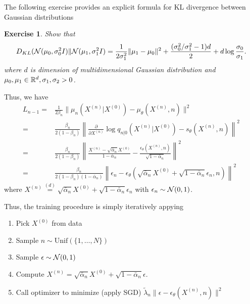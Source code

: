 \documentclass[11pt]{article}
\newtheorem{exercise}{Exercise}
\begin{document}
The following exercise provides an explicit formula for KL divergence between Gaussian distributions
\begin{exercise}
    Show that
    \begin{align}
        D_{KL}({\cal N}(\mu_0, \sigma_0^2I) \|{\cal N}(\mu_1, \sigma_1^2I) 
        = \frac{1}{2\sigma_1^2} \|\mu_1-\mu_0\|^2 + \frac{(\sigma_0^2/\sigma_1^2 -1)d}{2} + d\log \frac{\sigma_0}{\sigma_1}.
    \end{align}
    where $d$ is dimension of multidimensional Gaussian distribution and $\mu_0, \mu_1\in\mathbb{R}^d, \sigma_1, \sigma_2>0$.
\end{exercise}
Thus, we have
\begin{align}
    L_{n-1} =& \frac{1}{2\beta_n} \|\mu_n(X^{(n)}|X^{(0)}) - \mu_{\theta}(X^{(n)}, n)\|^2\\
    =& \frac{\beta_n}{2(1-\beta_n)} \left\|\frac{\partial}{\partial X^{(n)}} \log q_{n|0}(X^{(n)}|X^{(0)}) - s_{\theta}(X^{(n)}, n)\right\|^2\\
    =& \frac{\beta_n}{2(1-\beta_n)} \left\|\frac{X^{(n)} - \sqrt{\bar{\alpha}_n}X^{(0)}}{1-\bar{\alpha}_n} - \frac{\epsilon_{\theta}(X^{(n)}, n)}{\sqrt{1-\bar{\alpha}_n}}\right\|^2\\
    =& \frac{\beta_n}{2(1-\beta_n)(1-\bar{\alpha}_n)} \left\|\epsilon_n - \epsilon_{\theta}(\sqrt{\bar{\alpha}_n} X^{(0)} + \sqrt{1-\bar{\alpha}_n}\epsilon_n, n)\right\|^2
\end{align}
where $X^{(n)} \stackrel{(d)}{=} \sqrt{\bar{\alpha}_n}X^{(0)} + \sqrt{1-\bar{\alpha}_n} \epsilon_n$ with $\epsilon_n\sim{\cal N}(0, 1)$.




Thus, the training procedure is simply iteratively appying
\begin{enumerate}
    \item Pick $X^{(0)}$ from data
    \item Sample $n\sim\mbox{Unif}(\{1, \dots, N\})$
    \item Sample $\epsilon\sim {\cal N}(0, 1)$
    \item Compute $X^{(n)} = \sqrt{\bar{\alpha}_n} X^{(0)} + \sqrt{1-\bar{\alpha}_n} \epsilon$.
    \item Call optimizer to minimize (apply SGD) $\tilde{\lambda}_n \|\epsilon - \epsilon_\theta(X^{(n)}, n)\|^2$
\end{enumerate}
\end{document}
